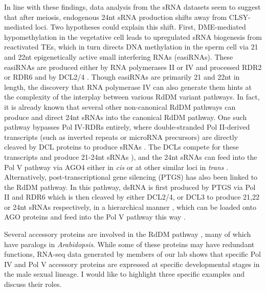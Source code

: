 In line with these findings, data analysis from the sRNA datasets seem to suggest that after meiosis, endogenous 24nt sRNA production shifts away from CLSY-mediated loci. Two hypotheses could explain this shift. First, DME-mediated hypomethylation in the vegetative cell leads to upregulated sRNA biogenesis from reactivated TEs, which in turn directs DNA methylation in the sperm cell \citep{RN57,RN39} via 21 and 22nt epigenetically active small interfering RNAs (easiRNAs). These easiRNAs are produced either by RNA polymerases II or IV and processed RDR2 or RDR6 and by DCL2/4 \citep{RN75}. Though easiRNAs are primarily 21 and 22nt in length, the discovery that RNA polymerase IV can also generate them hints at the complexity of the interplay between various RdDM variant pathways. In fact, it is already known that several other non-canonical RdDM pathways can produce and direct 24nt sRNAs into the canonical RdDM pathway. One such pathway bypasses Pol IV-RDRs entirely, where double-stranded Pol II-derived transcripts (such as inverted repeats or microRNA precursors) are directly cleaved by DCL proteins to produce sRNAs \citep{RN269}. The DCLs compete for these transcripts and produce 21-24nt sRNAs \citep{RN268}), and the 24nt sRNAs can feed into the Pol V pathway via AGO4 either in \textit{cis} or at other similar loci in \textit{trans} \citep{RN270,RN269}. Alternatively, post-transcriptional gene silencing (PTGS) has also been linked to the RdDM pathway. In this pathway, dsRNA is first produced by PTGS via Pol II and RDR6 which is then cleaved by either DCL2/4, or DCL3 to produce 21,22 or 24nt sRNAs respectively, in a hierarchical manner \citep{RN267}, which can be loaded onto AGO proteins and feed into the Pol V pathway this way \citep{RN133}. 

Several accessory proteins are involved in the RdDM pathway \citep{RN33}, many of which have paralogs in \textit{Arabidopsis}. While some of these proteins may have redundant functions, RNA-seq data generated by members of our lab shows that specific Pol IV and Pol V accessory proteins are expressed at specific developmental stages in the male sexual lineage. I would like to highlight three specific examples and discuss their roles. 

